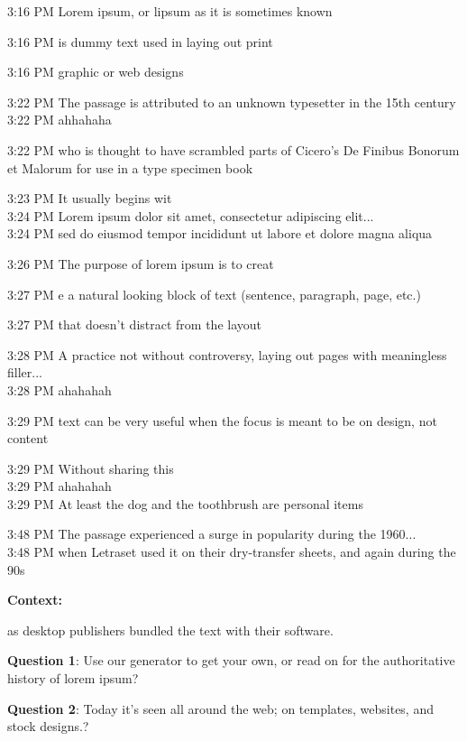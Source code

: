 \documentclass[11pt]{extarticle}
\begin{document}
\begin{chat}
3:16 PM Lorem ipsum, or lipsum as it is sometimes known

3:16 PM is dummy text used in laying out print

3:16 PM graphic or web designs

3:22 PM The passage is attributed to an unknown typesetter in the 15th century\\
3:22 PM ahhahaha

3:22 PM who is thought to have scrambled parts of Cicero's De Finibus Bonorum et Malorum for use in a type specimen book

3:23 PM It usually begins wit\\
3:24 PM Lorem ipsum dolor sit amet, consectetur adipiscing elit...\\
3:24 PM sed do eiusmod tempor incididunt ut labore et dolore magna aliqua

3:26 PM The purpose of lorem ipsum is to creat

3:27 PM e a natural looking block of text (sentence, paragraph, page, etc.)

3:27 PM that doesn't distract from the layout

3:28 PM A practice not without controversy, laying out pages with meaningless filler...\\
3:28 PM ahahahah

3:29 PM text can be very useful when the focus is meant to be on design, not content

3:29 PM Without sharing this \\
3:29 PM ahahahah\\
3:29 PM At least the dog and the toothbrush are personal items

3:48 PM The passage experienced a surge in popularity during the 1960...\\
3:48 PM when Letraset used it on their dry-transfer sheets, and again during the 90s



\end{chat}

\vspace{0.5in}

\textbf{Context:}

as desktop publishers bundled the text with their software.



\textbf{Question 1}: Use our generator to get your own, or read on for the authoritative history of lorem ipsum?



\textbf{Question 2}: Today it's seen all around the web; on templates, websites, and stock designs.?

%
%
%
%
\end{document}

